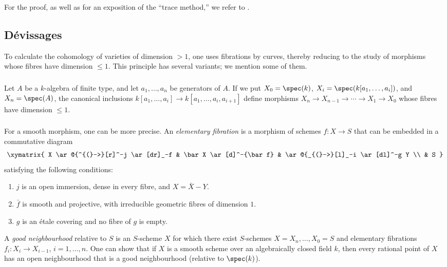 For the proof, as well as for an exposition of the “trace method,” we
refer to .

\subsection{Dévissages}\label{I:3-4}

To calculate the cohomology of varieties of dimension $>1$, one uses
fibrations by curves, thereby reducing to the study of morphisms whose
fibres have dimension $\leqslant1$. This principle has several variants;
we mention some of them.

\subsubsection{}\label{I:3-4-1}

Let $A$ be a $k$-algebra of finite type, and let $a_1,\dotsc,a_n$ be
generators of $A$. If we put $X_0=\spec(k)$,
$X_i=\spec(k[a_1,\dotsc,a_i])$, and $X_n=\spec(A)$, the canonical
inclusions
$k[a_1,\dotsc,a_i]\to k[a_1,\dotsc,a_i,a_{i+1}]$ define morphisms
$X_n\to X_{n-1}\to\cdots\to X_1\to X_0$ whose fibres have dimension
$\leqslant1$.

\subsubsection{}\label{I:3-4-2}

For a smooth morphism, one can be more precise. An
\emph{elementary fibration} is a morphism of schemes $f:X\to S$ that
can be embedded in a commutative diagram
\[\xymatrix{
  X \ar@{^{(}->}[r]^-j \ar[dr]_-f
    & \bar X \ar[d]^-{\bar f}
    & \ar@{_{(}->}[l]_-i \ar[dl]^-g Y \\
  & S
}\]
satisfying the following conditions:
\begin{enumerate}[\indent i)]
  \item $j$ is an open immersion, dense in every fibre, and
    $X=\bar X- Y$.
  \item $\bar f$ is smooth and projective, with irreducible geometric
    fibres of dimension $1$.
  \item $g$ is an étale covering and no fibre of $g$ is empty.
\end{enumerate}

A \emph{good neighbourhood} relative to $S$ is an $S$-scheme $X$ for
which there exist $S$-schemes $X=X_n,\dotsc,X_0=S$ and elementary
fibrations $f_i:X_i\to X_{i-1}$, $i=1,\dotsc,n$. One can show
 that if $X$ is a smooth scheme over an algebraically
closed field $k$, then every rational point of $X$ has an open
neighbourhood that is a good neighbourhood (relative to $\spec(k)$).

